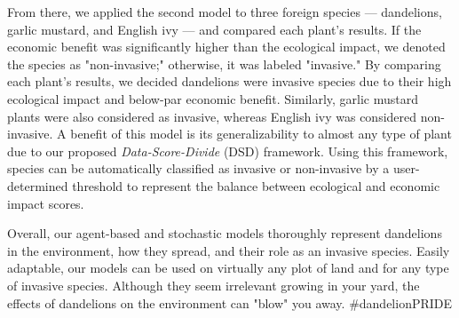 From there, we applied the second model to three foreign species — dandelions, garlic mustard, and English ivy — and compared each plant's results. If the economic benefit was significantly higher than the ecological impact, we denoted the species as "non-invasive;" otherwise, it was labeled "invasive." By comparing each plant's results, we decided dandelions were invasive species due to their high ecological impact and below-par economic benefit. Similarly, garlic mustard plants were also considered as invasive, whereas English ivy was considered non-invasive. A benefit of this model is its generalizability to almost any type of plant due to our proposed \textit{Data-Score-Divide} (DSD) framework. Using this framework, species can be automatically classified as invasive or non-invasive by a user-determined threshold to represent the balance between ecological and economic impact scores. 

Overall, our agent-based and stochastic models thoroughly represent dandelions in the environment, how they spread, and their role as an invasive species. Easily adaptable, our models can be used on virtually any plot of land and for any type of invasive species. Although they seem irrelevant growing in your yard, the effects of dandelions on the environment can "blow" you away. \#dandelionPRIDE
